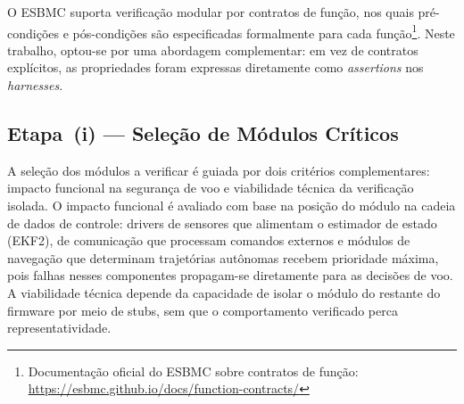 O ESBMC suporta verificação modular por contratos de função, nos
quais pré-condições e pós-condições são especificadas formalmente para cada
função\footnote{Documentação oficial do ESBMC sobre contratos de função: \url{https://esbmc.github.io/docs/function-contracts/}}. Neste trabalho, optou-se por uma abordagem
complementar: em vez de contratos explícitos, as propriedades foram expressas
diretamente como \textit{assertions} nos \textit{harnesses}.

\subsection{Etapa~(i) --- Seleção de Módulos Críticos}

A seleção dos módulos a verificar é guiada por dois critérios
complementares: impacto funcional na segurança de voo e viabilidade técnica da
verificação isolada. O impacto funcional é avaliado com base na posição do
módulo na cadeia de dados de controle: drivers de sensores que alimentam o
estimador de estado (EKF2),  de comunicação que processam comandos
externos e módulos de navegação que determinam trajetórias autônomas recebem
prioridade máxima, pois falhas nesses componentes propagam-se diretamente para
as decisões de voo. A viabilidade técnica depende da capacidade de isolar o
módulo do restante do firmware por meio de stubs, sem que o comportamento
verificado perca representatividade. 

